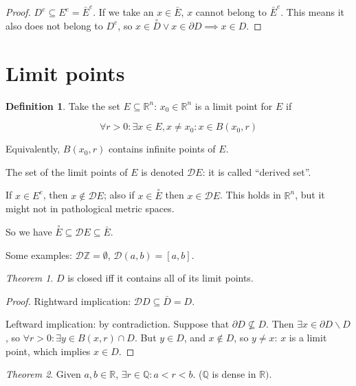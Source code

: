 \documentclass[12pt,a4paper]{report}
\numberwithin{equation}{section}
\theoremstyle{definition}
\newtheorem{definition}{Definition}[section]
\theoremstyle{remark}
\newtheorem{theorem}{Theorem}[section]
\begin{document}
\begin{proof}
$D^e \subseteq E^e = \bar{E}^e$. If we take an $x \in \bar{E}$, $x$ cannot belong to $\bar{E}^e$. This means it also does not belong to $D^e$, so $x \in \overset{\circ}{D} \vee x \in \partial D \implies x \in D$.
\end{proof}

\section{Limit points}

\begin{definition}
Take the set $E \subseteq \mathbb{R}^n$: $x_0 \in \mathbb{R}^n$ is a limit point for $E$ if

\begin{equation}
\forall r>0: \exists x \in E, x\neq x_0 : x \in B(x_0, r)
\end{equation}

Equivalently, $B(x_0, r)$ contains infinite points of $E$.

The set of the limit points of $E$ is denoted $\mathcal{D}E$: it is called ``derived set''.
\end{definition}

If $x \in E^e$, then $x \notin \mathcal{D}E$; also if $x \in \overset{\circ}{E}$ then $x \in \mathcal{D}E$. This holds in $\mathbb{R}^n$, but it might not in pathological metric spaces.

So we have $\overset{\circ}{E} \subseteq \mathcal{D}E \subseteq \bar{E}$.

Some examples: $\mathcal{D}\mathbb{Z} = \emptyset$, $\mathcal{D}(a, b) = [a, b]$.

\begin{theorem}
$D$ is closed iff it contains all of its limit points.
\end{theorem} 

\begin{proof}
Rightward implication: $\mathcal{D} D \subseteq \bar{D} = D$.

Leftward implication: by contradiction. Suppose that $\partial D \nsubseteq D$. Then $\exists x \in \partial D \smallsetminus D$, so $\forall r>0: \exists y \in B(x, r) \cap D$. But $y \in D$, and $x \notin D$, so $y\neq x$: $x$ is a limit point, which implies $x \in D$.
\end{proof}


\begin{theorem}
Given $a, b \in \mathbb{R}$, $\exists r \in \mathbb{Q}: a<r<b$. ($\mathbb{Q}$ is dense in $\mathbb{R})$.
\end{theorem}
\end{document}
